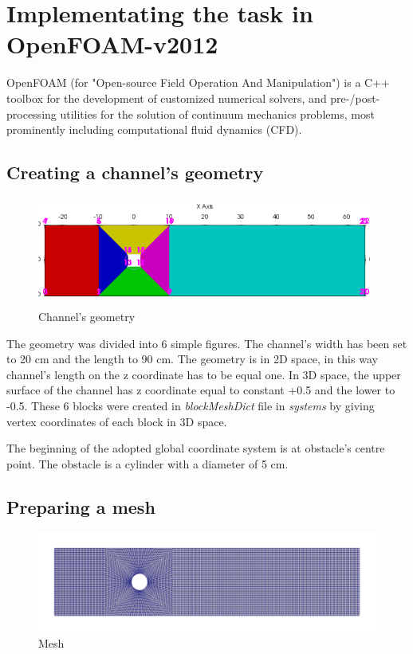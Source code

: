 \documentclass[a4paper,11pt]{article}
\begin{document}
\section{Implementating the task in OpenFOAM-v2012}
	
	OpenFOAM (for "Open-source Field Operation And Manipulation") is a C++ toolbox for the development of customized numerical solvers, and pre-/post-processing utilities for the solution of continuum mechanics problems, most prominently including computational fluid dynamics (CFD).
	
\subsection{Creating a channel's geometry}

\begin{figure}[h]
\centering
\includegraphics[width=11cm]{geometry.PNG}
\caption{Channel's geometry}
\end{figure}\par

The geometry was divided into 6 simple figures. The channel's width has been set to 20 cm and the length to 90 cm. The geometry is in 2D space, in this way channel's length on the z coordinate has to be equal one. In 3D space, the upper surface of the channel has z coordinate equal to constant +0.5 and the lower to -0.5. These 6 blocks were created in  \emph{blockMeshDict} file in \emph{systems} by giving vertex coordinates of each block in 3D space.

The beginning of the adopted global coordinate system is at obstacle's centre point. The obstacle is a cylinder with a diameter of 5 cm.	

\subsection{Preparing a mesh}

\begin{figure}[h]
\centering
\includegraphics[width=14cm]{mesh.PNG}
\caption{Mesh}
\end{figure}
\end{document}
